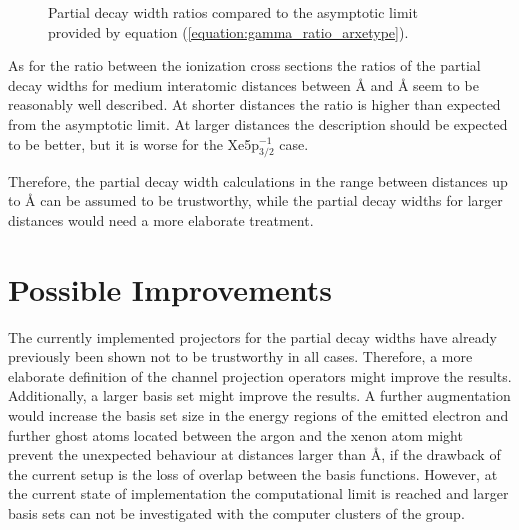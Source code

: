 \begin{figure}[]
  \centering
  
  \caption{Partial decay width ratios compared to the asymptotic limit provided
           by equation (\ref{equation:gamma_ratio_arxetype}).}
  \label{figure:arxe_rel_fano_ratios}
\end{figure}

As for the ratio between the ionization cross sections the ratios of the partial decay
widths for medium interatomic distances between \unit[5]{\AA} and \unit[15]{\AA}
seem to be reasonably well described. At shorter distances the ratio is higher
than expected from the asymptotic limit. At larger distances the description
should be expected to be better, but it is worse for the Xe5p$_{3/2}^{-1}$ case.

Therefore, the partial decay width calculations in the range between distances
up to \unit[10]{\AA} can be assumed to be trustworthy, while the
partial decay widths for larger distances would need a more elaborate treatment.



\section{Possible Improvements}
The currently implemented projectors for the partial decay widths have already
previously been shown not to be trustworthy in all cases. Therefore, a more elaborate
definition of the channel projection operators might improve the results.
Additionally, a larger basis set might improve the results. A further augmentation
would increase the basis set size in the energy regions of the emitted electron
and further ghost atoms located between the argon and the xenon atom might prevent
the unexpected behaviour at distances larger than \unit[10]{\AA}, if the
drawback of the current setup is the loss of overlap between the basis functions.
However, at the current state of implementation the computational limit is reached
and larger basis sets can not be investigated with the computer clusters of the
group.


